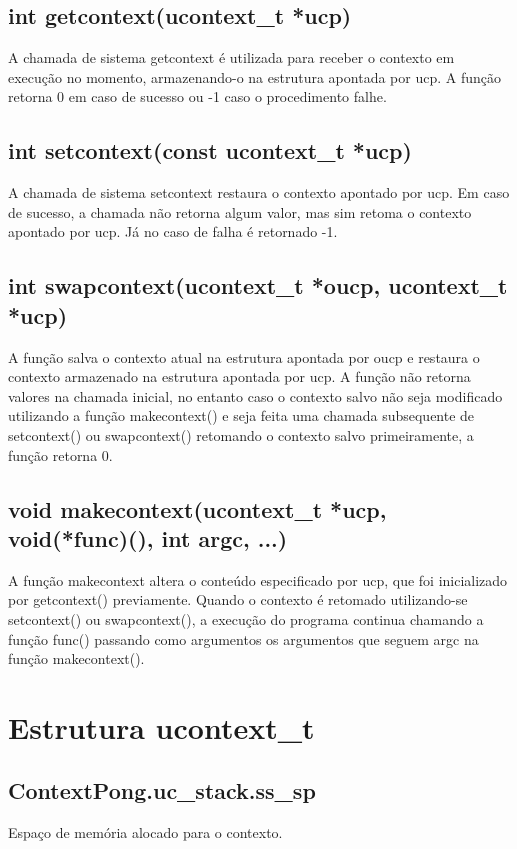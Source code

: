 \documentclass[12pt]{article}
\begin{document}
	\subsection{int getcontext(ucontext\_t *ucp)}
	A chamada de sistema getcontext é utilizada para receber o contexto em execução no momento, armazenando-o na estrutura apontada por ucp.
	A função retorna 0 em caso de sucesso ou -1 caso o procedimento falhe.
	
	
	\subsection{int setcontext(const ucontext\_t *ucp)}
	A chamada de sistema setcontext restaura o contexto apontado por ucp. Em caso de sucesso, a chamada não retorna algum valor, mas sim retoma o contexto apontado por ucp. Já no caso de falha é retornado -1.
	
	
	\subsection{int swapcontext(ucontext\_t *oucp, ucontext\_t *ucp)}
	A função salva o contexto atual na estrutura apontada por oucp e restaura o contexto armazenado na estrutura apontada por ucp. A função não retorna valores na chamada inicial, no entanto caso o contexto salvo não seja modificado utilizando a função makecontext() e seja feita uma chamada subsequente de setcontext() ou swapcontext() retomando o contexto salvo primeiramente, a função retorna 0.
	
	
	\subsection{void makecontext(ucontext\_t *ucp, void(*func)(), int argc, ...)}
	A função makecontext altera o conteúdo especificado por ucp, que foi inicializado por getcontext() previamente. Quando o contexto é retomado utilizando-se setcontext() ou swapcontext(), a execução do programa continua chamando a função func() passando como argumentos os argumentos que seguem argc na função makecontext().

\section{Estrutura ucontext\_t}
\subsection{ContextPong.uc\_stack.ss\_sp}
Espaço de memória alocado para o contexto.
\end{document}
